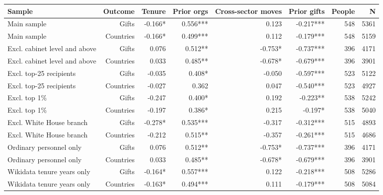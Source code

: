 \begin{tabular}{lrrrrrrr}
\toprule
Sample & Outcome & Tenure & Prior orgs & Cross-sector moves & Prior gifts & People & N \\
\midrule
Main sample & Gifts & -0.166* & 0.556*** & 0.123 & -0.217*** & 548 & 5361 \\
Main sample & Countries & -0.166* & 0.499*** & 0.112 & -0.179*** & 548 & 5159 \\
Excl. cabinet level and above & Gifts & 0.076 & 0.512** & -0.753* & -0.737*** & 396 & 4171 \\
Excl. cabinet level and above & Countries & 0.033 & 0.485** & -0.678* & -0.679*** & 396 & 3901 \\
Excl. top-25 recipients & Gifts & -0.035 & 0.408* & -0.050 & -0.597*** & 523 & 5122 \\
Excl. top-25 recipients & Countries & -0.027 & 0.362 & 0.047 & -0.540*** & 523 & 4927 \\
Excl. top 1\% & Gifts & -0.247 & 0.400* & 0.192 & -0.223** & 538 & 5242 \\
Excl. top 1\% & Countries & -0.197 & 0.386* & 0.215 & -0.197* & 538 & 5040 \\
Excl. White House branch & Gifts & -0.278* & 0.535*** & -0.317 & -0.312*** & 515 & 4893 \\
Excl. White House branch & Countries & -0.212 & 0.515** & -0.357 & -0.261*** & 515 & 4686 \\
Ordinary personnel only & Gifts & 0.076 & 0.512** & -0.753* & -0.737*** & 396 & 4171 \\
Ordinary personnel only & Countries & 0.033 & 0.485** & -0.678* & -0.679*** & 396 & 3901 \\
Wikidata tenure years only & Gifts & -0.164* & 0.557*** & 0.122 & -0.218*** & 508 & 5286 \\
Wikidata tenure years only & Countries & -0.163* & 0.494*** & 0.111 & -0.179*** & 508 & 5084 \\
\bottomrule
\end{tabular}
\par{}
